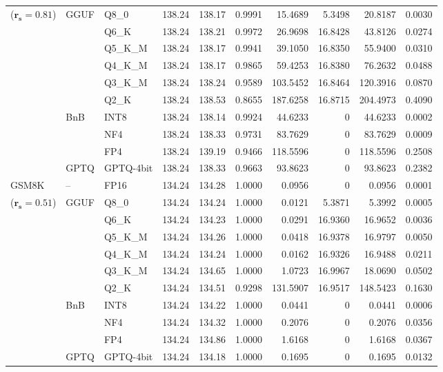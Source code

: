 \begin{longtable}{ll l rrrrrrr}
{\small ($\mathbf{r_s{=}0.81}$)} & GGUF & Q8\_0 & 138.24 & 138.17 & 0.9991 & 15.4689 & 5.3498 & 20.8187 & 0.0030 \\
 &  & Q6\_K & 138.24 & 138.21 & 0.9972 & 26.9698 & 16.8428 & 43.8126 & 0.0274 \\
 &  & Q5\_K\_M & 138.24 & 138.17 & 0.9941 & 39.1050 & 16.8350 & 55.9400 & 0.0310 \\
 &  & Q4\_K\_M & 138.24 & 138.17 & 0.9865 & 59.4253 & 16.8380 & 76.2632 & 0.0488 \\
 &  & Q3\_K\_M & 138.24 & 138.24 & 0.9589 & 103.5452 & 16.8464 & 120.3916 & 0.0870 \\
 &  & Q2\_K & 138.24 & 138.53 & \cellcolor{red!18} 0.8655 & \cellcolor{red!18} 187.6258 & 16.8715 & \cellcolor{red!18} 204.4973 & \cellcolor{red!18} 0.4090 \\
 & BnB & INT8 & 138.24 & 138.14 & 0.9924 & 44.6233 & \cellcolor{cyan!12} $0$ & 44.6233 & 0.0002 \\
 &  & NF4 & 138.24 & 138.33 & 0.9731 & 83.7629 & \cellcolor{cyan!12} $0$ & 83.7629 & 0.0009 \\
 &  & FP4 & 138.24 & 139.19 & \cellcolor{red!18} 0.9466 & \cellcolor{red!18} 118.5596 & \cellcolor{cyan!12} $0$ & \cellcolor{red!18} 118.5596 & \cellcolor{red!18} 0.2508 \\
 & GPTQ & GPTQ-4bit & 138.24 & 138.33 & 0.9663 & 93.8623 & \cellcolor{cyan!12} $0$ & 93.8623 & 0.2382 \\
\midrule
GSM8K & -- & FP16 & 134.24 & 134.28 & 1.0000 & 0.0956 & \cellcolor{cyan!12} $0$ & 0.0956 & 0.0001 \\
{\small ($\mathbf{r_s{=}0.51}$)} & GGUF & Q8\_0 & 134.24 & 134.24 & 1.0000 & 0.0121 & 5.3871 & 5.3992 & 0.0005 \\
 &  & Q6\_K & 134.24 & 134.23 & 1.0000 & 0.0291 & 16.9360 & 16.9652 & 0.0036 \\
 &  & Q5\_K\_M & 134.24 & 134.26 & 1.0000 & 0.0418 & 16.9378 & 16.9797 & 0.0050 \\
 &  & Q4\_K\_M & 134.24 & 134.24 & 1.0000 & 0.0162 & 16.9326 & 16.9488 & 0.0211 \\
 &  & Q3\_K\_M & 134.24 & 134.65 & 1.0000 & 1.0723 & 16.9967 & 18.0690 & 0.0502 \\
 &  & Q2\_K & 134.24 & 134.51 & \cellcolor{red!18} 0.9298 & \cellcolor{red!18} 131.5907 & 16.9517 & \cellcolor{red!18} 148.5423 & \cellcolor{red!18} 0.1630 \\
 & BnB & INT8 & 134.24 & 134.22 & 1.0000 & 0.0441 & \cellcolor{cyan!12} $0$ & 0.0441 & 0.0006 \\
 &  & NF4 & 134.24 & 134.32 & 1.0000 & 0.2076 & \cellcolor{cyan!12} $0$ & 0.2076 & 0.0356 \\
 &  & FP4 & 134.24 & 134.86 & 1.0000 & 1.6168 & \cellcolor{cyan!12} $0$ & 1.6168 & 0.0367 \\
 & GPTQ & GPTQ-4bit & 134.24 & 134.18 & 1.0000 & 0.1695 & \cellcolor{cyan!12} $0$ & 0.1695 & 0.0132 \\
\end{longtable}
\endgroup